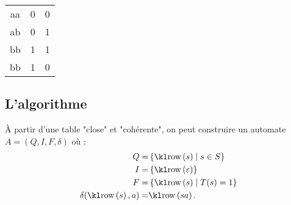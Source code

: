 \begin{exemple}
\begin{itemize}
\begin{center}
\begin{tabular}{c|c|c}
				      aa         & 0          & 0 \\
				      ab         & 0          & 1 \\
				      bb         & 1          & 1 \\
				      bb         & 1          & 0 \\
			      \end{tabular}
		      \end{center}
	\end{itemize}
\end{exemple}


\subsection{L'algorithme}

\begin{theorem}\label{thm:automata-tables}
	À partir d'une table "close" et "cohérente", on peut construire un automate $A = (Q, I, F, \delta)$ où :
	$$
		\begin{aligned}
			Q                   = & \setdef{ \row{s}} {s \in S }  \\
			I                   = & \set{ \row{\motvide} }        \\
			F                   = & \setdef{ \row{s} }{T(s) = 1 } \\
			\delta(\row{s}, a)  = & \row{sa}.
		\end{aligned}
	$$
\end{theorem}

